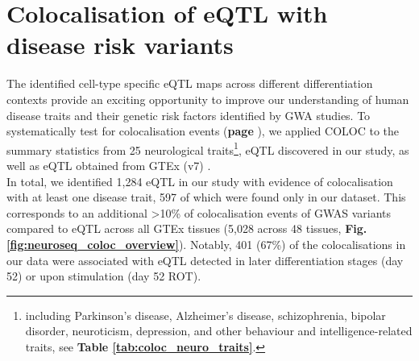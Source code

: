 




\clearpage

\section{Colocalisation of eQTL with disease risk variants}
\label{sec:neuroseq_coloc}

The identified cell-type specific eQTL maps across different differentiation contexts provide an exciting opportunity to improve our understanding of human disease traits and their genetic risk factors identified by GWA studies.
To systematically test for colocalisation events (\textbf{page \pageref{sec:eqtl_gwas}}), we applied COLOC \cite{giambartolomei2014bayesian} to the summary statistics from 25 neurological traits\footnote{including Parkinson's disease, Alzheimer's disease, schizophrenia, bipolar disorder, neuroticism, depression, and other behaviour and intelligence-related traits, see \textbf{Table \ref{tab:coloc_neuro_traits}}.}, eQTL discovered in our study, as well as eQTL obtained from GTEx (v7) \cite{gtex2017genetic}.\\

In total, we identified 1,284 eQTL in our study with evidence of colocalisation with at least one disease trait, 597 of which were found only in our dataset. 
This corresponds to an additional >10\% of colocalisation events of GWAS variants compared to eQTL across all GTEx tissues (5,028 across 48 tissues, \textbf{Fig. \ref{fig:neuroseq_coloc_overview}}). 
Notably, 401 (67\%) of the colocalisations in our data were associated with eQTL detected in later differentiation stages (day 52) or upon stimulation (day 52 ROT).\\

